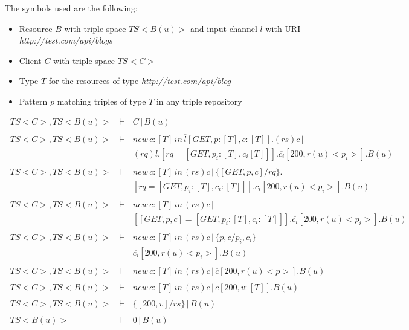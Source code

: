 The symbols used are the following:
\begin{itemize}
  \item Resource $B$ with triple space $TS<B(u)>$ and input channel $l$ with URI \emph{http://test.com/api/blogs}
  \item Client $C$ with triple space $TS<C>$
  \item Type $T$ for the resources of type \emph{http://test.com/api/blog}
  \item Pattern $p$ matching triples of type $T$ in any triple repository
\end{itemize}



\setcounter{equation}{0}
\begin{eqnarray*}
 \ TS<C>,TS<B(u)>\, &\vdash\,&  C\,|\,B(u) \\
 \               &        &          \\
 \ TS<C>,TS<B(u)>\, &\vdash\,& new\,c:[T]\,in\,\overline{l}[GET,p:[T],c:[T]].(rs)c\,|\\
 \               &\,      &(rq)l.[rq = [GET,p_i:[T],c_i[T]]].\overline{c_i}[200,r(u)<p_i>].B(u) \\
 \               &        &          \\
 \ TS<C>,TS<B(u)>\, &\vdash\,& new\,c:[T]\,in\,(rs)c\,|\, \{[GET,p,c]/rq\}.\\
 \               &\,      &[rq = [GET,p_i:[T],c_i:[T]]].\overline{c_i}[200,r(u)<p_i>].B(u) \\
 \               &        &          \\
 \ TS<C>,TS<B(u)>\, &\vdash\,& new\,c:[T]\,in\,(rs)c\,|\, \\
 \               &\,      &[[GET,p,c] = [GET,p_i:[T],c_i:[T]]].\overline{c_i}[200,r(u)<p_i>].B(u) \\
\end{eqnarray*}
\begin{eqnarray*}
\ TS<C>,TS<B(u)>\, &\vdash\,& new\,c:[T]\,in\,(rs)c\,|\,\{p,c/p_i,c_i\} \\
 \               &\,      &\overline{c_i}[200,r(u)<p_i>].B(u) \\
 \               &        &          \\
 \ TS<C>,TS<B(u)>\, &\vdash\,& new\,c:[T]\,in\,(rs)c\,|\,\overline{c}[200,r(u)<p>].B(u) \\
 \               &        &          \\
 \ TS<C>,TS<B(u)>\, &\vdash\,& new\,c:[T]\,in\,(rs)c\,|\,\overline{c}[200,v:[T]].B(u) \\
 \               &        &          \\
 \ TS<C>,TS<B(u)>\, &\vdash\,& \{[200,v]/rs\}\,|\,B(u) \\
 \               &        &          \\
 \ TS<B(u)>\, &\vdash\,& 0\,|\,B(u) \\
\end{eqnarray*}


